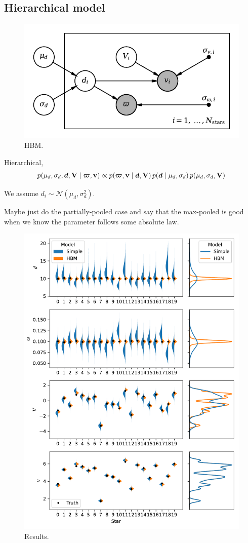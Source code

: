 \subsection{Hierarchical model}

\begin{figure}[!tb]
    \centering
    \includegraphics{figures/hbm-pgm.pdf}
    \caption{HBM.}
\end{figure}

Hierarchical,
%
\begin{equation}
    p(\mu_d, \sigma_d, \bm{d}, \bm{\mathrm{V}} \mid \bm{\varpi}, \bm{\mathrm{v}}) \propto p(\bm{\varpi}, \bm{\mathrm{v}} \mid \bm{d}, \bm{\mathrm{V}}) \, p(\bm{d} \mid \mu_d, \sigma_d) \, p(\mu_d, \sigma_d, \bm{\mathrm{V}})
\end{equation}
%

We assume \(d_i \sim \mathcal{N}(\mu_d, \sigma_d^2)\).

Maybe just do the partially-pooled case and say that the max-pooled is good when we know the parameter follows some absolute law.

\begin{figure}[p]
    \centering
    \includegraphics{figures/hbm-results.pdf}
    \caption{Results.}
\end{figure}